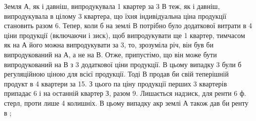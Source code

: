 Земля $А$, як і давніш, випродукувала 1 квартер за 3 $В$ теж,
як і давніш, випродукувала в цілому 3 квартера, що їхня індивідуальна ціна
продукції становить разом 6. Тепер, коли б на землі $В$ потрібно було
додаткової витрати в 4 ціни продукції (включаючи і зиск), щоб випродукувати ще 1 квартер,
тимчасом як на $А$ його можна випродукувати за
3, то, зрозуміла річ, він був би випродукований на $А$, а не на $В$.
Отже, припустімо, що він може бути випродукований на $В$ з 3
додаткової ціни продукції. В цьому випадку 3 були б регуляційною ціною
для всієї продукції. Тоді $В$ продав би свій теперішній продукт в 4  квартери за
15. З цього па ціну продукції перших 3  квартерів припадає
6 і на останній квартер З, разом 9. Лишається
надзиск, для ренти \deq{} 6  ф. стерл, проти лише 4 колишніх.
В цьому випадку акр землі $А$ також дав би ренту в  ;
\parbreak{}  %
